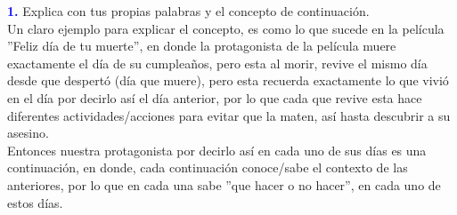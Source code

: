\Large\textbf{\textcolor{blue}{1.}}
Explica con tus propias palabras y el concepto de continuación.\\

Un claro ejemplo para explicar el concepto, es como lo que sucede en la película
''Feliz día de tu muerte'', en donde la protagonista de la película muere
exactamente el día de su cumpleaños, pero esta al morir, revive el mismo día desde que
despertó (día que muere), pero esta recuerda exactamente lo que vivió en el día por
decirlo así el día anterior, por lo que cada que revive esta hace diferentes
actividades/acciones para evitar que la maten, así hasta descubrir a su asesino.\\

Entonces nuestra protagonista por decirlo así en cada uno de sus días es una
continuación, en donde, cada continuación conoce/sabe el contexto de las
anteriores, por lo que en cada una sabe ''que hacer o no hacer'', en cada uno de
estos días. \\
